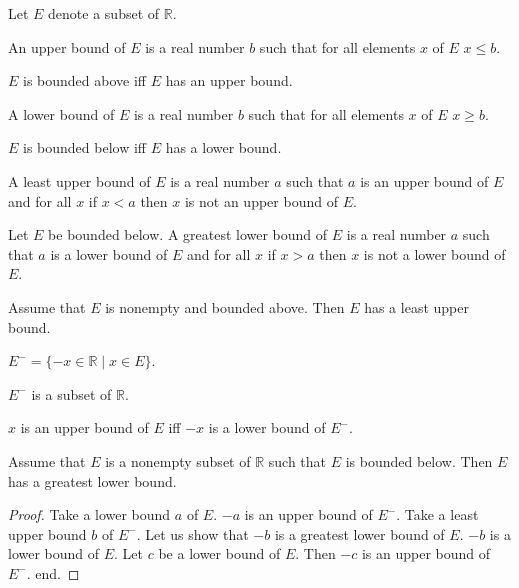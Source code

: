 \documentclass{article}
\begin{document}
\begin{forthel}

Let $E$ denote a subset of $\mathbb{R}$.

\begin{definition}[1 7]
An upper bound of $E$ is a
real number $b$ such that for all elements $x$ of $E$ $x \leq b$.
\end{definition}

\begin{definition}[1 7a] $E$ is 
bounded above iff
$E$ has an upper bound.\end{definition}

\begin{definition}[1 7b] 
A lower bound of $E$ is a
real number $b$ such that for all elements $x$ of $E$ $x \geq b$.
\end{definition}

\begin{definition}[1 7c]
$E$ is bounded below iff
$E$ has a lower bound.\end{definition}

\begin{definition}[1 8] A least upper bound of $E$ is a real number 
$a$ such that
$a$ is an upper bound of $E$ and for all $x$ if $x < a$ then $x$ 
is not an upper bound of $E$.\end{definition}

\begin{definition}[1 8a] Let $E$ be bounded below.
A greatest lower bound of $E$ is a real number $a$ such that
$a$ is a lower bound of $E$ and for all $x$ if $x > a$ then $x$ is 
not a lower bound of $E$.\end{definition}

\begin{axiom}[1 19] Assume that $E$ is nonempty and bounded
above. Then $E$ has a least upper bound.
\end{axiom}

\begin{definition} 
$E^- = \{-x \in \mathbb{R} \mid x \in E\}$.\end{definition}

\begin{lemma} $E^-$ is a subset of $\mathbb{R}$.
\end{lemma}

\begin{lemma}
$x$ is an upper bound of $E$ iff $-x$ is a lower bound of $E^-$.
\end{lemma}


\begin{theorem}[1 11] Assume that $E$ is a nonempty subset of $\mathbb{R}$ 
such that $E$ is bounded below.
Then $E$ has a greatest lower bound.\end{theorem}
\begin{proof}
Take a lower bound $a$ of $E$.
$-a$ is an upper bound of $E^-$.
Take a least upper bound $b$ of $E^-$.
Let us show that $-b$ is a greatest lower bound of $E$.
$-b$ is a lower bound of $E$. Let $c$ be a lower bound of $E$. 
Then $-c$ is an upper bound of $E^-$.
end. \end{proof}

\end{forthel}
\end{document}
